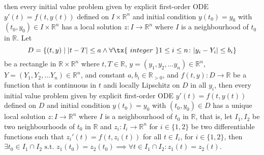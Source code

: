 \documentclass[a4paper,12pt]{report}
\begin{document}
then every initial value problem given by explicit first-order ODE $y'(t)=f\left(t,y(t)\right)$ defined on $I\times\mathbb{R}^n$ and initial condition $y\left(t_{0}\right)=y_{0}$ with $(t_{0},y_{0})\in I\times\mathbb{R}^n$ has a local solution $z\colon I\to \mathbb {R}^n$ where $I$ is a neighbourhood of $t_0$ in $\mathbb{R}$.
Let
\[D=\{(t,y)\mid|t-T|\leq a\land\forall\tx{\ integer\ }1\leq i\leq n\colon |y_i-Y_i|\leq b_i\}\]
be a rectangle in $\mathbb{R}\times\mathbb{R}^n$ where $t,T\in\mathbb{R}$, $y=(y_1, y_2,\dots  y_n)\in\mathbb{R}^n$, $Y=(Y_1, Y_2,\dots  Y_n)\in\mathbb{R}^n$, and constant $a,b_i\in\mathbb{R}_{>0}$, and $f(t,y)\colon D\to \mathbb {R}$ be a function that is continuous in $t$ andi locally Lipschitz on $D$ in all $y_i$, then every initial value problem given by explicit first-order ODE $y'(t)=f\left(t,y(t)\right)$ defined on $D$ and initial condition $y\left(t_{0}\right)=y_{0}$ with $(t_{0},y_{0})\in D$ has a unique local solution $z\colon I\to \mathbb {R}^n$ where $I$ is a neighbourhood of $t_0$ in $\mathbb {R} $, that is, let $I_1,I_2$ be two neighbourhoods of $t_0$ in $\mathbb{R}$ and $z_i\colon I_i\to\mathbb{R}^n$ for $i\in\{1,2\}$ be two differentiable functions such that $z_i'(t)=f\left(t,z_i(t)\right)$ for all $t\in I_i$, for $i\in\{1,2\}$, then $\exists t_0\in I_1\cap I_2\text{\ s.t.\ }z_1(t_0)=z_2(t_0)\implies\forall t\in I_1\cap I_2\colon z_1(t)=z_2(t)$.
\end{document}
